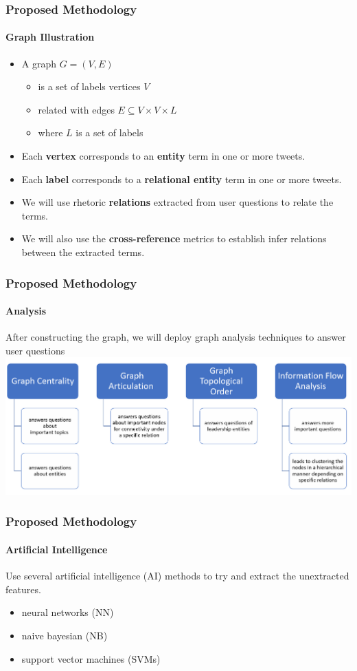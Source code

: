 \documentclass[xcolor=table]{beamer}
\begin{document}
\begin{frame}
\frametitle{Proposed Methodology}
\framesubtitle{Graph Illustration}
\begin{itemize}
\item A graph  $G=(V,E)$ 
\begin{itemize}
    \item is a set of labels vertices $V$
    \item related with edges $E\subseteq V\times V\times L$
    \item where $L$ is a set of labels
\end{itemize}

\item Each \textbf{vertex} corresponds to an \textbf{entity} term in one or more tweets. 
\item Each \textbf{label} corresponds to a \textbf{relational entity} term in one or more tweets.
\item We will use rhetoric \textbf{relations} extracted from user questions to relate the terms. 
\item We will also use the \textbf{cross-reference} metrics to establish infer relations between the extracted terms. 
\end{itemize}

\end{frame}


\begin{frame}
\frametitle{Proposed Methodology}
\framesubtitle{Analysis}
After constructing the graph, we will deploy graph analysis techniques to answer user questions
\includegraphics[scale=0.35]{Picture6.png}

\end{frame}

\begin{frame}
\frametitle{Proposed Methodology}
\framesubtitle{Artificial Intelligence}
Use several artificial intelligence (AI) methods to try and extract the unextracted features.

\begin{itemize}
    \item neural networks (NN)
    \item naive bayesian (NB)
    \item support vector machines (SVMs)
\end{itemize}
\end{frame}
\end{document}
